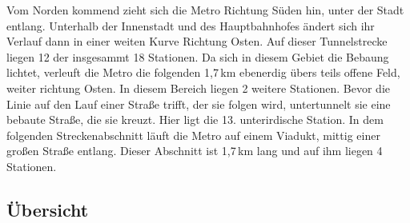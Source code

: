 Vom Norden kommend zieht sich die Metro Richtung Süden hin, unter der Stadt entlang. Unterhalb der Innenstadt und des Hauptbahnhofes ändert sich ihr Verlauf dann in einer weiten Kurve Richtung Osten. Auf dieser Tunnelstrecke liegen 12 der insgesammt 18 Stationen. Da sich in diesem Gebiet die Bebaung lichtet, verleuft die Metro die folgenden 1,7\,km ebenerdig übers teils offene Feld, weiter richtung Osten. In diesem Bereich liegen 2 weitere Stationen. Bevor die Linie auf den Lauf einer Straße trifft, der sie folgen wird, untertunnelt sie eine bebaute Straße, die sie kreuzt. Hier ligt die 13. unterirdische Station. In dem folgenden Streckenabschnitt läuft die Metro auf einem Viadukt, mittig einer großen Straße entlang. Dieser Abschnitt ist 1,7\,km lang und auf ihm liegen 4 Stationen.\cite{brescSts}


\begin{landscape}
\enlargethispage{2cm}
\begin{minipage}{\textwidth}
\section{Übersicht}

\end{minipage}
\end{landscape}


